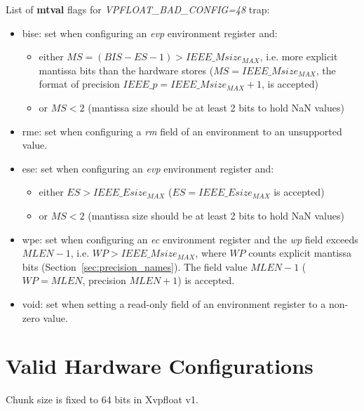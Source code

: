 List of \textbf{mtval} flags for {\em VPFLOAT\_BAD\_CONFIG=48} trap:
\begin{itemize}[topsep=0pt]
    \item bise: set when configuring an {\em evp} environment register and:
    \begin{itemize}[noitemsep,topsep=0pt]
        \item either $MS=(BIS-ES-1) > IEEE\_Msize_{MAX}$, i.e. more explicit mantissa bits than the hardware stores ($MS = IEEE\_Msize_{MAX}$, the format of precision $IEEE\_p = IEEE\_Msize_{MAX} + 1$, is accepted)
        \item or $MS < 2$ (mantissa size should be at least 2 bits to hold NaN values)
    \end{itemize}
    \item rme: set when configuring a {\em rm} field of an environment to an unsupported value.
    \item ese: set when configuring an {\em evp} environment register and:
    \begin{itemize}[noitemsep,topsep=0pt]
        \item either $ES > IEEE\_Esize_{MAX}$ ($ES = IEEE\_Esize_{MAX}$ is accepted)
        \item or $MS < 2$ (mantissa size should be at least 2 bits to hold NaN values)
    \end{itemize}
    \item wpe: set when configuring an {\em ec} environment register and the {\em wp} field exceeds $MLEN - 1$, i.e. $WP > IEEE\_Msize_{MAX}$, where $WP$ counts explicit mantissa bits (Section~\ref{sec:precision_names}).
    The field value $MLEN - 1$ ($WP = MLEN$, precision $MLEN + 1$) is accepted.
    \item void: set when setting a read-only field of an environment register to a non-zero value.
\end{itemize}

\section{Valid Hardware Configurations}
\label{sec:hard_cfg}

Chunk size is fixed to 64 bits in Xvpfloat v1.

